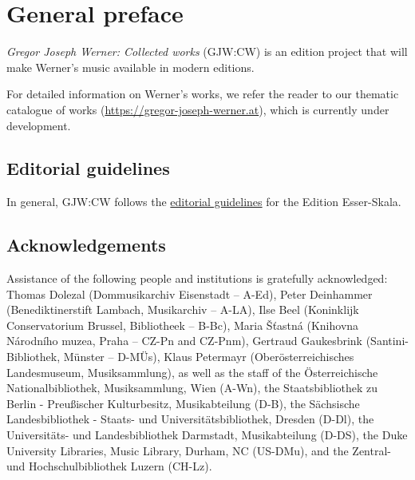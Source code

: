 \documentclass{ees}
\begin{document}

\setcounter{page}{1}

\tableofcontents

\chapter{General preface}

\textit{Gregor Joseph Werner: Collected works} (GJW:CW) is an edition project that will make Werner’s music available in modern editions.

For detailed information on Werner's works, we refer the reader to our thematic catalogue of works (\href{https://gregor-joseph-werner.at}{https://gregor-joseph-werner.at}), which is currently under development.


\section{Editorial guidelines}

In general, GJW:CW follows the \href{https://edition.esser-skala.at/about/editorial-guidelines/}{editorial guidelines} for the Edition Esser-Skala.




\section{Acknowledgements}

Assistance of the following people and institutions is gratefully acknowledged:
Thomas Dolezal (Dommusikarchiv Eisenstadt – A-Ed),
Peter Deinhammer (Benediktinerstift Lambach, Musikarchiv – A-LA),
Ilse Beel (Koninklijk Conservatorium Brussel, Bibliotheek – B-Bc),
Maria Šťastná (Knihovna Národního muzea, Praha – CZ-Pn and CZ-Pnm),
Gertraud Gaukesbrink (Santini-Bibliothek, Münster – D-MÜs),
Klaus Petermayr (Oberösterreichisches Landesmuseum, Musiksammlung),
as well as the staff of
the Österreichische Nationalbibliothek, Musiksammlung, Wien (A-Wn),
the Staatsbibliothek zu Berlin - Preußischer Kulturbesitz, Musikabteilung (D-B),
the Sächsische Landesbibliothek - Staats- und Universitätsbibliothek, Dresden (D-Dl),
the Universitäts- und Landesbibliothek Darmstadt, Musikabteilung (D-DS),
the Duke University Libraries, Music Library, Durham, NC (US-DMu),
and the Zentral- und Hochschulbibliothek Luzern (CH-Lz).


\clearpage
{}
\end{document}
